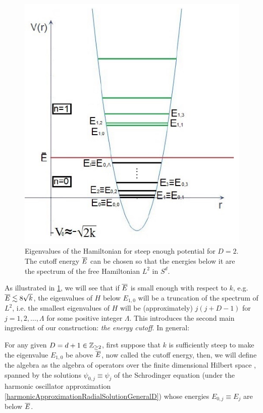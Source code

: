\begin{figure}[h]
    \centering
    \includegraphics[width = \textwidth/2]{images/FioreEigenvalues.PNG}
    \caption{Eigenvalues of the Hamiltonian for steep enough potential for $D = 2$. The cutoff energy $\overline{E}$ can be chosen so that the energies below it are the spectrum of the free Hamiltonian $L^2$ in $S^d$.}
    \label{fig:D2EigenvaluesEigenEnergiesHarmonicCutoff}
\end{figure}

As illustrated in \ref{fig:D2EigenvaluesEigenEnergiesHarmonicCutoff}, we will see that if $\overline{E}$ is small enough with respect to $k$, e.g. $\overline{E} \lesssim 8\sqrt{k}$, the eigenvalues of $H$ below $E_{1,0}$ will be a truncation of the spectrum of $L^2$, i.e. the smallest eigenvalues of $H$ will be (approximately) $j(j+D-1)$ for $j = 1, 2, \dots, \Lambda$ for some positive integer $\Lambda$. This introduces the second main ingredient of our construction: \textit{the energy cutoff}. In general:
\begin{definition}\label{definitionAcalHcalGeneralD}
For any given $D = d + 1 \in \mathbb{Z}_{\geq 2}$, first suppose that $k$ is sufficiently steep to make the eigenvalue $E_{1, 0}$ be above $\overline{E}$, now called the cutoff energy, %
then, we will define the algebra  as the algebra of operators over the finite dimensional Hilbert space , spanned by the solutions $\psi_{0, j} \equiv \psi_j$ of the Schrodinger equation (under the harmonic oscillator approximation \ref{harmonicApproximationRadialSolutionGeneralD}) whose energies $E_{0, j} \equiv E_j$ are below $\overline{E}$.
\end{definition}

